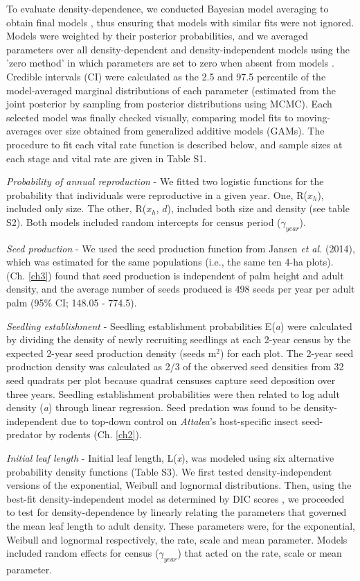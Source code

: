 \documentclass[b5paper,justified]{tufte-book} %
\begin{document}
\begin{fullwidth}
To evaluate density-dependence, we conducted Bayesian model averaging to obtain final models \citep{Hoeting1999,Bishop2006}, thus ensuring that models with similar fits were not ignored. Models were weighted by their posterior probabilities, and we averaged parameters over all density-dependent and density-independent models using the 'zero method' in which parameters are set to zero when absent from models \citep{Grueber2011}. Credible intervals (CI) were calculated as the 2.5 and 97.5 percentile of the model-averaged marginal distributions of each parameter (estimated from the joint posterior by sampling from posterior distributions using MCMC). Each selected model was finally checked visually, comparing model fits to moving-averages over size obtained from generalized additive models (GAMs). The procedure to fit each vital rate function is described below, and sample sizes at each stage and vital rate are given in Table S1.   

\textit{Probability of annual reproduction} - We fitted two logistic functions for the probability that individuals were reproductive in a given year. One, R($x_h$), included only size. The other, R($x_h$, $d$), included both size and density (see table S2). Both models included random intercepts for census period ($\gamma_{year}$).
 
\textit{Seed production} - We used the seed production function from Jansen \emph{et al.} (2014), which was estimated for the same populations (i.e., the same ten 4-ha plots). \citealt{Jansen2014} (Ch. \ref{ch3}) found that seed production is independent of palm height and adult density, and the average number of seeds produced is 498 seeds per year per adult palm (95\% CI; 148.05 - 774.5). 

\textit{Seedling establishment} - Seedling establishment probabilities E(\emph{a}) were calculated by dividing the density of newly recruiting seedlings at each 2-year census by the expected 2-year seed production density (seeds m$^2$) for each plot. The 2-year seed production density was calculated as 2/3 of the observed seed densities from 32 seed quadrats per plot because quadrat censuses capture seed deposition over three years. Seedling establishment probabilities were then related to log adult density (\emph{a}) through linear regression. Seed predation was found to be density-independent due to top-down control on \textit{Attalea}'s host-specific insect seed-predator by rodents (Ch. \ref{ch2}). 

\textit{Initial leaf length} - Initial leaf length, L(\textit{x}), was modeled using six alternative probability density functions (Table S3). We first tested density-independent versions of the exponential, Weibull and lognormal distributions. Then, using the best-fit density-independent model as determined by DIC scores \citep{Spiegelhalter2002}, we proceeded to test for density-dependence by linearly relating the parameters that governed the mean leaf length to adult density. These parameters were, for the exponential, Weibull and lognormal respectively, the rate, scale and mean parameter. Models included random effects for census ($\gamma_{year}$) that acted on the rate, scale or mean parameter. 


\end{fullwidth}
\end{document}
